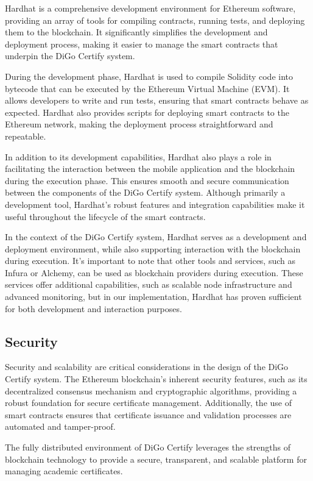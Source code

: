 Hardhat is a comprehensive development environment for Ethereum software, providing an array of tools for compiling contracts, running tests, and deploying them to the blockchain. It significantly simplifies the development and deployment process, making it easier to manage the smart contracts that underpin the DiGo Certify system.

During the development phase, Hardhat is used to compile Solidity code into bytecode that can be executed by the Ethereum Virtual Machine (EVM). It allows developers to write and run tests, ensuring that smart contracts behave as expected. Hardhat also provides scripts for deploying smart contracts to the Ethereum network, making the deployment process straightforward and repeatable.

In addition to its development capabilities, Hardhat also plays a role in facilitating the interaction between the mobile application and the blockchain during the execution phase. This ensures smooth and secure communication between the components of the DiGo Certify system. Although primarily a development tool, Hardhat's robust features and integration capabilities make it useful throughout the lifecycle of the smart contracts.

In the context of the DiGo Certify system, Hardhat serves as a development and deployment environment, while also supporting interaction with the blockchain during execution. It's important to note that other tools and services, such as Infura or Alchemy, can be used as blockchain providers during execution. These services offer additional capabilities, such as scalable node infrastructure and advanced monitoring, but in our implementation, Hardhat has proven sufficient for both development and interaction purposes.

\subsection{Security}

Security and scalability are critical considerations in the design of the DiGo Certify system. The Ethereum blockchain’s inherent security features, such as its decentralized consensus mechanism and cryptographic algorithms, providing a robust foundation for secure certificate management. Additionally, the use of smart contracts ensures that certificate issuance and validation processes are automated and tamper-proof\cite{Wood2014}.

The fully distributed environment of DiGo Certify leverages the strengths of blockchain technology to provide a secure, transparent, and scalable platform for managing academic certificates.

